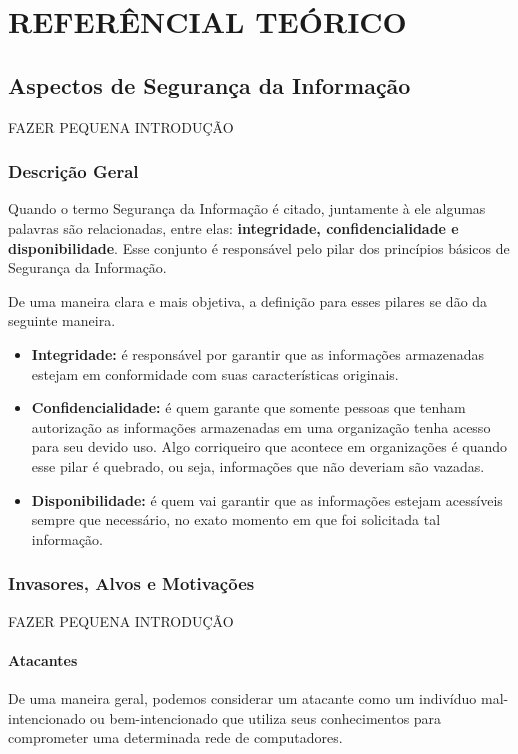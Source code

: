 \chapter{REFERÊNCIAL TEÓRICO}

\section{Aspectos de Segurança da Informação}
FAZER PEQUENA INTRODUÇÃO
\subsection{Descrição Geral}
Quando o termo Segurança da Informação é citado, juntamente à ele algumas palavras são relacionadas, entre elas: \textbf{integridade, confidencialidade e disponibilidade}. Esse conjunto é responsável pelo pilar dos princípios básicos de Segurança da Informação.

De uma maneira clara e mais objetiva, a definição para esses pilares se dão da seguinte maneira.

\begin{itemize}
\item \textbf{Integridade:} é responsável por garantir que as informações armazenadas estejam em conformidade com suas características originais.

\item \textbf{Confidencialidade:} é quem garante que somente pessoas que tenham autorização as informações armazenadas em uma organização tenha acesso para seu devido uso. Algo corriqueiro que acontece em organizações é quando esse pilar é quebrado, ou seja, informações que não deveriam são vazadas.

\item \textbf{Disponibilidade:} é quem vai garantir que as informações estejam acessíveis sempre que necessário, no exato momento em que foi solicitada tal informação.
\end{itemize} 

\subsection{Invasores, Alvos e Motivações}
FAZER PEQUENA INTRODUÇÃO

\subsubsection{Atacantes}
De uma maneira geral, podemos considerar um atacante como um indivíduo mal-intencionado ou bem-intencionado que utiliza seus conhecimentos para comprometer uma determinada rede de computadores.

